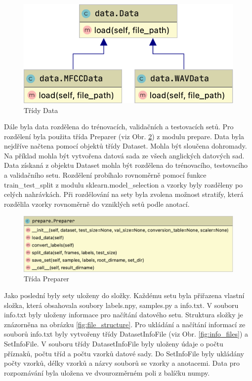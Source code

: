\documentclass[FM,BP]{tulthesis}
\begin{document}
\begin{figure}[h]
\centerline{\includegraphics[scale=.25,keepaspectratio]{data-data.png}}
\caption{Třídy Data}
\label{fig:data}
\end{figure}
\FloatBarrier

Dále byla data rozdělena do trénovacích, validačních a testovacích setů. Pro rozdělení byla použita třída Preparer (viz Obr. \ref{fig:preparer}) z modulu prepare. Data byla nejdříve načtena pomocí objektů třídy Dataset. Mohla být sloučena dohromady. Na příklad mohla být vytvořena datová sada ze všech anglických datových sad. Data získaná z objektu Dataset mohla být rozdělena do trénovacího, testovacího a validačního setu. Rozdělení probíhalo rovnoměrně pomocí funkce train\_test\_split z modulu sklearn.model\_selection a vzorky byly rozděleny po celých nahrávkách. Při rozdělování na sety byla zvolena možnost stratify, která rozdělila vzorky rovnoměrně do vzniklých setů podle anotací.

\begin{figure}[h]
\centerline{\includegraphics[scale=.25,keepaspectratio]{prepare.png}}
\caption{Třída Preparer}
\label{fig:preparer}
\end{figure}
\FloatBarrier

Jako poslední byly sety uloženy do složky. Každému setu byla přiřazena vlastní složka, která obsahovala soubory labels.npy, samples.py a info.txt. V souboru info.txt byly uloženy informace pro načítání datového setu. Struktura složky je znázorněna na obrázku \ref{fig:file_structure}. Pro ukládání a načítání informací ze souborů info.txt byly vytvořeny třídy DatasetInfoFile (viz Obr. \ref{fig:info_files}) a SetInfoFile. V souboru třídy DatasetInfoFile byly uloženy údaje o počtu příznaků, počtu tříd a počtu vzorků datové sady. Do SetInfoFile byly ukládány počty vzorků, délky vzorků a názvy souborů se vzorky a anotacemi. Data pro rozpoznávání byla uložena ve dvourozměrném poli z balíčku numpy.
\end{document}
